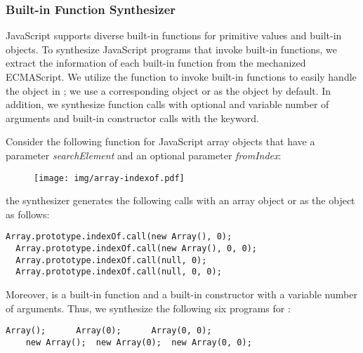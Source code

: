 \subsubsection{Built-in Function Synthesizer}

JavaScript supports diverse built-in functions for primitive values and built-in objects.
To synthesize JavaScript programs that invoke built-in functions,
we extract the information of each built-in function from the mechanized ECMAScript.
We utilize the  function to invoke
built-in functions to easily handle the  object in ;
we use a corresponding object or  as the  object by default.
In addition, we synthesize function calls with optional and variable number of arguments
and built-in constructor calls with the  keyword.

Consider the following  function for
JavaScript array objects that have a parameter \textit{searchElement}
and an optional parameter \textit{fromIndex}:

\vspace*{-.5em}
\begin{figure}[H]
  \centering
  \texttt{[image: img/array-indexof.pdf]}
\end{figure}
\vspace*{-.5em}

\noindent
the synthesizer generates the following calls with an array object or  as the 
object as follows:
\begin{lstlisting}[style=myJSstyle]
  Array.prototype.indexOf.call(new Array(), 0);
  Array.prototype.indexOf.call(new Array(), 0, 0);
  Array.prototype.indexOf.call(null, 0);
  Array.prototype.indexOf.call(null, 0, 0);
\end{lstlisting}
Moreover,  is a built-in function and
a built-in constructor with a variable number of arguments.
Thus, we synthesize the following six programs for :
\begin{lstlisting}[style=myJSstyle]
    Array();      Array(0);      Array(0, 0);
    new Array();  new Array(0);  new Array(0, 0);
\end{lstlisting}

